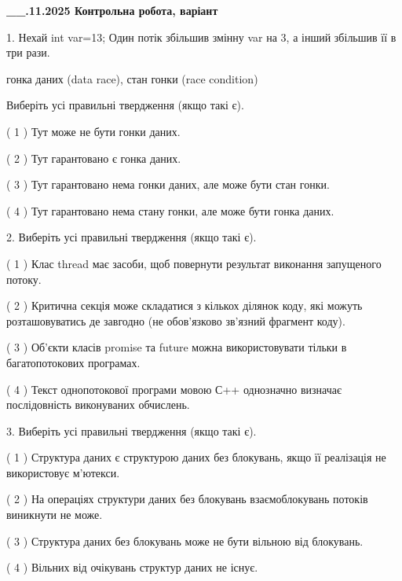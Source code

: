 \documentclass[12pt, ukrainian]{article}
\begin{document}
\newpage
\begin {large}

\textbf{\_\_.11.2025 Контрольна робота, варіант  }\par


{
1. Нехай int var=13; Один потік збільшив змінну var на 3, а інший збільшив її в три рази.

гонка даних (data race), стан гонки (race condition)

Виберіть усі правильні твердження (якщо такі є).\par
\vspace{2mm}
( 1 ) Тут може не бути гонки даних.%

( 2 ) Тут гарантовано є гонка даних.%

( 3 ) Тут гарантовано нема гонки даних, але може бути стан гонки.%

( 4 ) Тут гарантовано нема стану гонки, але може бути гонка даних.%


2. Виберіть усі правильні твердження (якщо такі є).\par
\vspace{2mm}

( 1 ) Клас thread має засоби, щоб повернути результат виконання запущеного потоку.%

( 2 ) Критична секція може складатися з кількох ділянок коду, які можуть розташовуватись де завгодно (не обов’язково зв’язний фрагмент коду).%

( 3 ) Об’єкти класів promise та future можна використовувати тільки в багатопотокових програмах.%

( 4 ) Текст однопотокової програми мовою С++ однозначно визначає послідовність виконуваних обчислень.%


3. Виберіть усі правильні твердження (якщо такі є).\par
\vspace{2mm}

( 1 ) Структура даних є структурою даних без блокувань, якщо її реалізація не використовує м’ютекси.%

( 2 ) На операціях структури даних без блокувань взаємоблокувань потоків виникнути не може.%

( 3 ) Структура даних без блокувань може не бути вільною від блокувань.%

( 4 ) Вільних від очікувань структур даних не існує.%


}
\end{large}
\end{document}
